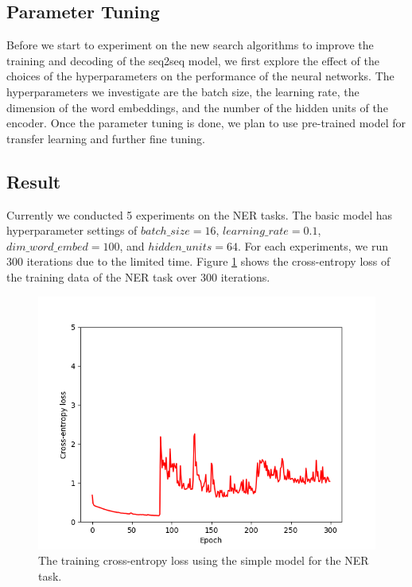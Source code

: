 \documentclass[11pt,a4paper]{article}
\begin{document}
\subsection{Parameter Tuning} \label{ssec:paratune}

Before we start to experiment on the new search algorithms to improve the training and decoding of the seq2seq model, we first explore the effect of the choices of the hyperparameters on the performance of the neural networks. The hyperparameters we investigate are the batch size, the learning rate, the dimension of the word embeddings, and the number of the hidden units of the encoder. Once the parameter tuning is done, we plan to use pre-trained model for transfer learning and further fine tuning.


\subsection{Result} \label{ssec:baseline}
Currently we conducted 5 experiments on the NER tasks. The basic model has hyperparameter settings of $batch\_size=16$, $learning\_rate = 0.1$, $dim\_word\_embed =100$, and $hidden\_units=64$. For each experiments, we run 300 iterations due to the limited time. Figure \ref{fig:fig_exp1} shows the cross-entropy loss of the training data of the NER task over 300 iterations. 

\begin{figure}[h]
\centering
\includegraphics[width=0.8\linewidth]{fig_exp1.png}
\caption{The training cross-entropy loss using the simple model for the NER task.}
\label{fig:fig_exp1}
\end{figure}
\end{document}
